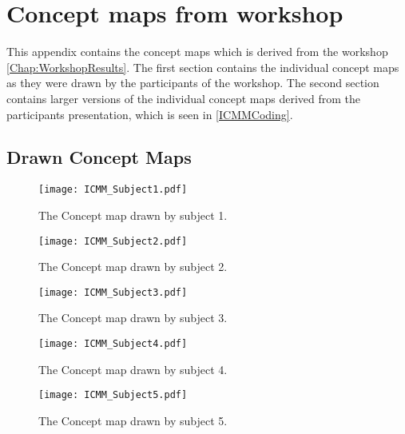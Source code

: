 \chapter{Concept maps from workshop}
\label{WorkshopConceptMaps}
This appendix contains the concept maps which is derived from the workshop \autoref{Chap:WorkshopResults}. The first section contains the individual concept maps as they were drawn by the participants of the workshop. The second section contains larger versions of the individual concept maps derived from the participants presentation, which is seen in \autoref{ICMMCoding}.

\section{Drawn Concept Maps}
\label{DrawnConceptMaps}
%
\begin{figure}[H]
	\centering
	\texttt{[image: ICMM\_Subject1.pdf]}
	\caption{The Concept map drawn by subject 1.}
	\label{fig:DrawnICMM1}
\end{figure}
%
\begin{figure}[H]
	\centering
	\texttt{[image: ICMM\_Subject2.pdf]}
	\caption{The Concept map drawn by subject 2.}
	\label{fig:DrawnICMM2}
\end{figure}
%
\begin{figure}[H]
	\centering
	\texttt{[image: ICMM\_Subject3.pdf]}
	\caption{The Concept map drawn by subject 3.}
	\label{fig:DrawnICMM3}
\end{figure}
%
\begin{figure}[H]
	\centering
	\texttt{[image: ICMM\_Subject4.pdf]}
	\caption{The Concept map drawn by subject 4.}
	\label{fig:DrawnICMM4}
\end{figure}
%
\begin{figure}[H]
	\centering
	\texttt{[image: ICMM\_Subject5.pdf]}
	\caption{The Concept map drawn by subject 5.}
	\label{fig:DrawnICMM5}
\end{figure}

